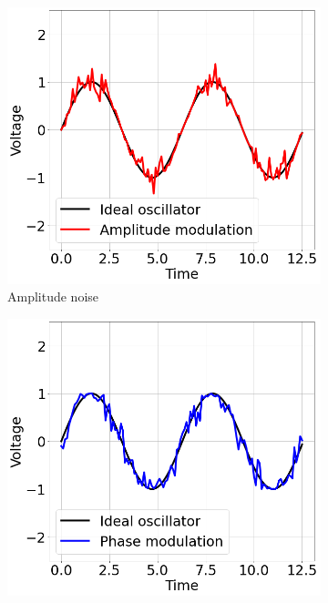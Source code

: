 \begin{figure}[!ht]
    \centering
    \begin{subfigure}[b]{0.45\textwidth}
        \centering
        \includegraphics[width=1\textwidth]{./images/app_B/oscillator_example_AN.png}
        \caption{Amplitude noise}
        \label{fig:AN_PN_example_a}
    \end{subfigure}
    \hfill
    \begin{subfigure}[b]{0.45 \textwidth}
        \centering
        \includegraphics[width=1 \textwidth]{./images/app_B/oscillator_example_PN.png}

\end{subfigure}
\end{figure}
